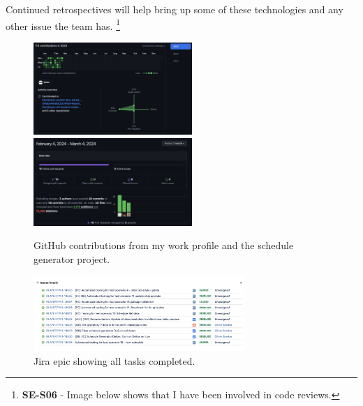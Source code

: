   Continued retrospectives will help bring up some of these technologies and any other issue the team has.
  \footnote{\textbf{SE-S06} - Image below shows that I have been involved in code reviews.}

  \begin{figure}[H]
    \centering
    \includegraphics[width=6cm]{assets/outputs/githubContributions.png}
    \includegraphics[width=6cm]{assets/outputs/scheduleGeneratorChanges.png}

    \caption{GitHub contributions from my work profile and the schedule generator project.}
    \label{fig:githubStats}
  \end{figure}

  \begin{figure}[H]
    \centering
    \includegraphics[width=8cm]{assets/outputs/jiraTasksCompleted.png}
    \caption{Jira epic showing all tasks completed.}
    \label{fig:jiraTasksCompleted}
  \end{figure}
  
\newpage
